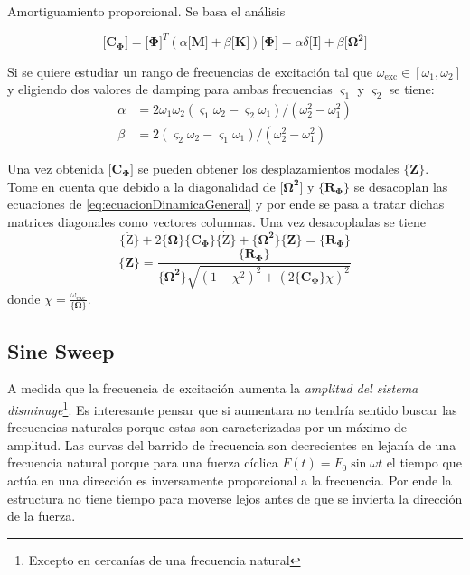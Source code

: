 \documentclass[11pt, a4paper,titlepage]{article}
\newcommand{\Phib}{\boldsymbol{\Phi}}
\newcommand{\Omegab}{\boldsymbol{\Omega}}
\newcommand{\COmega}{\Cme{\Omegab}}
\newcommand{\Mme}[1]{\boldsymbol{[}\mathbf{#1} \boldsymbol{]}}
\newcommand{\Cme}[1]{\boldsymbol{\{ }\mathbf{#1} \boldsymbol{\}} }
\newcommand{\modal}{{_{\Phib}}}
\newcommand{\dampfact}{\varsigma}
\begin{document}
Amortiguamiento proporcional. Se basa el análisis 

\begin{equation}
	\Mme{C\modal} = \Mme{\Phib}^T ( \alpha \Mme{M}+\beta \Mme{K})\Mme{\Phib} = \alpha \delta \Mme{I} +\beta \Mme{\Omegab^2}
\end{equation}

Si se quiere estudiar un rango de frecuencias de excitación tal que $\omega_{\mathrm{exc}}\in [\omega_1, \omega_2]$ y eligiendo dos valores de damping para ambas frecuencias $\dampfact_1$ y $\dampfact_2$ se tiene:
\begin{align*}
\alpha &= 2\omega_1 \omega_2 (\dampfact_1 \omega_2 -\dampfact_2 \omega_1)/(\omega_2^2 - \omega_1^2) \\ \beta &= 2(\dampfact_2\omega_2 -\dampfact_1 \omega_1)/(\omega_2^2 - \omega_1^2)
\end{align*}

Una vez obtenida $\Mme{C\modal}$ se pueden obtener los desplazamientos modales $\Cme{Z}$. Tome en cuenta que debido a la diagonalidad de $\Mme{\Omegab^2}$ y $\Cme{R\modal }$ se desacoplan las ecuaciones de \ref{eq:ecuacionDinamicaGeneral} y por ende se pasa a tratar dichas matrices diagonales como vectores columnas. Una vez desacopladas se tiene
 \[\Cme{\boldsymbol{\ddot{\mathrm{Z}}}}+2\COmega \Cme{C\modal} \Cme{\boldsymbol{\dot{\mathrm{Z}}}} + \Cme{\Omegab^2} \Cme{Z} = \Cme{R\modal} \]
\[
\Cme{Z} = \frac{\Cme{R\modal }}{ \Cme{\Omegab^2} \sqrt{(1-\chi^2)^2 + (2 \Cme{C\modal} \chi)^2}}
\]
donde $\chi = \frac{\omega_{\mathrm{exc}}}{\COmega}$. 



\subsection*{Sine Sweep}
A medida que la frecuencia de excitación aumenta la \textit{amplitud del sistema disminuye}\footnote{Excepto en cercanías de una frecuencia natural}. Es interesante pensar que si aumentara no tendría sentido buscar las frecuencias naturales porque estas son caracterizadas por un máximo de amplitud. Las curvas del barrido de frecuencia son decrecientes en lejanía de una frecuencia natural porque para una fuerza cíclica $F(t)=F_0\sin \omega t$ el tiempo que actúa en una dirección es inversamente proporcional a la frecuencia. Por ende la estructura no tiene tiempo para moverse lejos antes de que se invierta la dirección de la fuerza.
\end{document}
